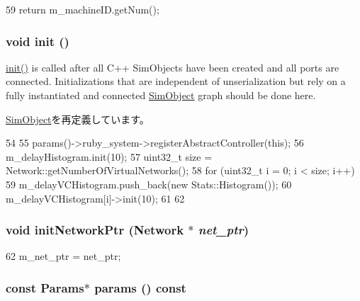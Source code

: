 \begin{DoxyCode}
59 { return m_machineID.getNum(); }
\end{DoxyCode}
\hypertarget{classAbstractController_a02fd73d861ef2e4aabb38c0c9ff82947}{
\subsubsection[{init}]{\setlength{\rightskip}{0pt plus 5cm}void init ()}}
\label{classAbstractController_a02fd73d861ef2e4aabb38c0c9ff82947}
\hyperlink{classAbstractController_a02fd73d861ef2e4aabb38c0c9ff82947}{init()} is called after all C++ SimObjects have been created and all ports are connected. Initializations that are independent of unserialization but rely on a fully instantiated and connected \hyperlink{classSimObject}{SimObject} graph should be done here. 

\hyperlink{classSimObject_a02fd73d861ef2e4aabb38c0c9ff82947}{SimObject}を再定義しています。


\begin{DoxyCode}
54 {
55     params()->ruby_system->registerAbstractController(this);
56     m_delayHistogram.init(10);
57     uint32_t size = Network::getNumberOfVirtualNetworks();
58     for (uint32_t i = 0; i < size; i++) {
59         m_delayVCHistogram.push_back(new Stats::Histogram());
60         m_delayVCHistogram[i]->init(10);
61     }
62 }
\end{DoxyCode}
\hypertarget{classAbstractController_a319f9c65d0c91a62be0c99b53a702e8d}{
\subsubsection[{initNetworkPtr}]{\setlength{\rightskip}{0pt plus 5cm}void initNetworkPtr ({\bf Network} $\ast$ {\em net\_\-ptr})}}
\label{classAbstractController_a319f9c65d0c91a62be0c99b53a702e8d}



\begin{DoxyCode}
62 { m_net_ptr = net_ptr; }
\end{DoxyCode}
\hypertarget{classAbstractController_acd3c3feb78ae7a8f88fe0f110a718dff}{
\subsubsection[{params}]{\setlength{\rightskip}{0pt plus 5cm}const {\bf Params}$\ast$ params () const}}
\label{classAbstractController_acd3c3feb78ae7a8f88fe0f110a718dff}


